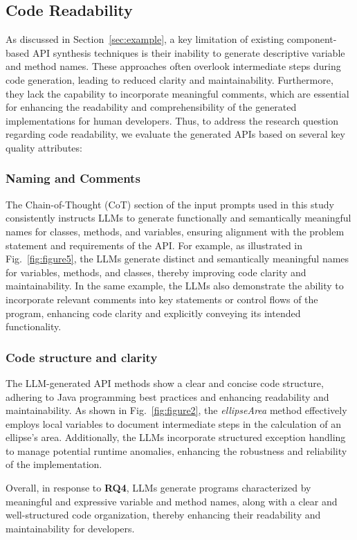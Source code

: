 \subsection{Code Readability}
\label{sec:sec46}
As discussed in Section~\ref{sec:example}, a key limitation of existing component-based API synthesis techniques is their inability to generate descriptive variable and method names. These approaches often overlook intermediate steps during code generation, leading to reduced clarity and maintainability. Furthermore, they lack the capability to incorporate meaningful comments, which are essential for enhancing the readability and comprehensibility of the generated implementations for human developers. Thus, to address the research question regarding code readability, we evaluate the generated APIs based on several key quality attributes:

\subsubsection{Naming and Comments}
\label{sec:sec461}
The Chain-of-Thought (CoT) section of the input prompts used in this study consistently instructs LLMs to generate functionally and semantically meaningful names for classes, methods, and variables, ensuring alignment with the problem statement and requirements of the API. For example, as illustrated in Fig.~\ref{fig:figure5}, the LLMs generate distinct and semantically meaningful names for variables, methods, and classes, thereby improving code clarity and maintainability. In the same example, the LLMs also demonstrate the ability to incorporate relevant comments into key statements or control flows of the program, enhancing code clarity and explicitly conveying its intended functionality.

\subsubsection{Code structure and clarity}
\label{sec:sec462}
The LLM-generated API methods show a clear and concise code structure, adhering to Java programming best practices and enhancing readability and maintainability. As shown in Fig.~\ref{fig:figure2}, the \textit{ellipseArea} method effectively employs local variables to document intermediate steps in the calculation of an ellipse's area. Additionally, the LLMs incorporate structured exception handling to manage potential runtime anomalies, enhancing the robustness and reliability of the implementation.

Overall, in response to \textbf{RQ4}, LLMs generate programs characterized by meaningful and expressive variable and method names, along with a clear and well-structured code organization, thereby enhancing their readability and maintainability for developers.


